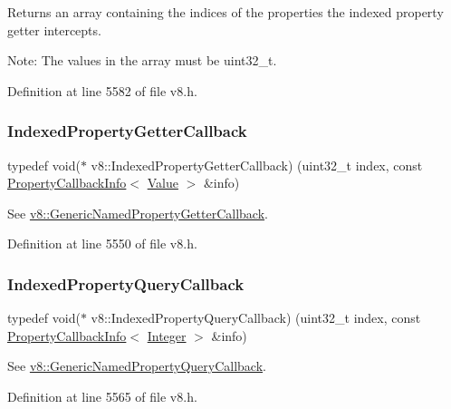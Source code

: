 Returns an array containing the indices of the properties the indexed property getter intercepts.

Note\+: The values in the array must be uint32\+\_\+t. 

Definition at line 5582 of file v8.\+h.

\mbox{\label{namespacev8_a48e7816ba64447bf32a25d194588daaf}} 
\subsubsection{\texorpdfstring{Indexed\+Property\+Getter\+Callback}{IndexedPropertyGetterCallback}}
{\footnotesize\ttfamily typedef void($\ast$ v8\+::\+Indexed\+Property\+Getter\+Callback) (uint32\+\_\+t index, const \mbox{\hyperlink{classv8_1_1PropertyCallbackInfo}{Property\+Callback\+Info}}$<$ \mbox{\hyperlink{classv8_1_1Value}{Value}} $>$ \&info)}

See {\ttfamily \mbox{\hyperlink{namespacev8_a24b1801fa53a7c5a71366d8044927563}{v8\+::\+Generic\+Named\+Property\+Getter\+Callback}}}. 

Definition at line 5550 of file v8.\+h.

\mbox{\label{namespacev8_a980b62c33eb664783e61e25c3b27f9ee}} 
\subsubsection{\texorpdfstring{Indexed\+Property\+Query\+Callback}{IndexedPropertyQueryCallback}}
{\footnotesize\ttfamily typedef void($\ast$ v8\+::\+Indexed\+Property\+Query\+Callback) (uint32\+\_\+t index, const \mbox{\hyperlink{classv8_1_1PropertyCallbackInfo}{Property\+Callback\+Info}}$<$ \mbox{\hyperlink{classv8_1_1Integer}{Integer}} $>$ \&info)}

See {\ttfamily \mbox{\hyperlink{namespacev8_add9f7ab11e4a9a2b9ad2c4536b0e1a64}{v8\+::\+Generic\+Named\+Property\+Query\+Callback}}}. 

Definition at line 5565 of file v8.\+h.

\mbox{\label{namespacev8_a4ac7cc6185ebc8b6a199f9fa8e6bf5c3}} 
